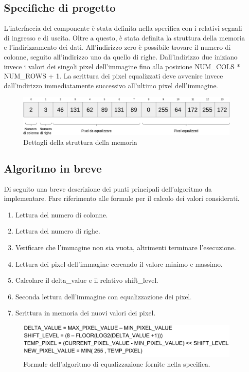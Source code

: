\documentclass{article}
\begin{document}
\subsection{Specifiche di progetto}
L'interfaccia del componente è stata definita nella specifica con i relativi segnali di ingresso e di uscita. Oltre a questo, è stata definita la struttura della memoria e l'indirizzamento dei dati. All'indirizzo zero è possibile trovare il numero di colonne, seguito all'indirizzo uno da quello di righe. Dall'indirizzo due iniziano invece i valori dei singoli pixel dell'immagine fino alla posizione NUM\_COLS * NUM\_ROWS + 1. La scrittura dei pixel equalizzati deve avvenire invece dall'indirizzo immediatamente successivo all'ultimo pixel dell'immagine.
\begin{figure}[h]
    \includegraphics[width=\textwidth]{memory.png}
    \centering
    \caption{Dettagli della struttura della memoria}
\end{figure}

\pagebreak

\subsection{Algoritmo in breve}
Di seguito una breve descrizione dei punti principali dell'algoritmo da implementare. Fare riferimento alle formule per il calcolo dei valori considerati.
\begin{enumerate}
    \item Lettura del numero di colonne.
    \item Lettura del numero di righe.
    \item Verificare che l'immagine non sia vuota, altrimenti terminare l'esecuzione.
    \item Lettura dei pixel dell'immagine cercando il valore minimo e massimo.
    \item Calcolare il delta\_value e il relativo shift\_level.
    \item Seconda lettura dell'immagine con equalizzazione dei pixel.
    \item Scrittura in memoria dei nuovi valori dei pixel.
\end{enumerate}
\begin{figure}[h]
    \includegraphics[width=\textwidth]{formulas.png}
    \centering
    \caption{Formule dell'algoritmo di equalizzazione fornite nella specifica.}
\end{figure}
\end{document}
